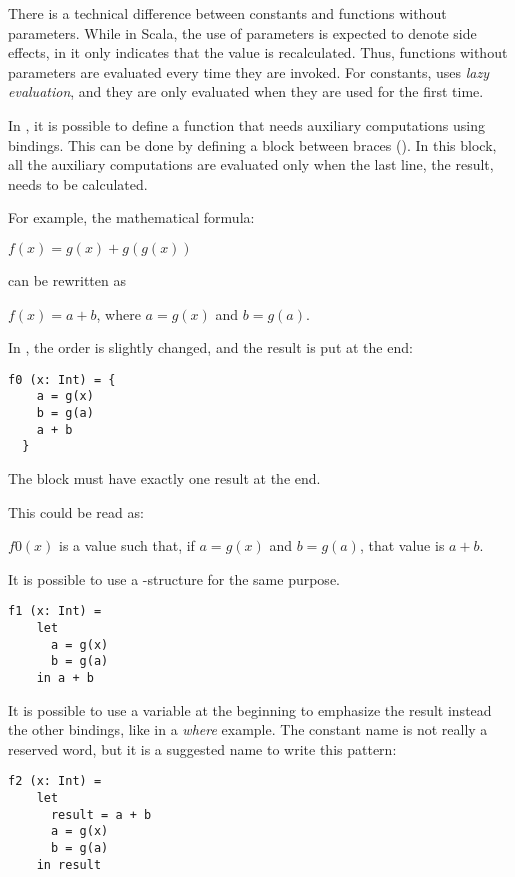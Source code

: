 There is a technical difference between constants and functions without parameters.
While in Scala, the use of parameters is expected to denote side effects, in \Soda it only indicates that the value is recalculated.
Thus, functions without parameters are evaluated every time they are invoked.
For constants, \Soda uses \textit{lazy evaluation}, and they are only evaluated when they are used for the first time.

In \Soda, it is possible to define a function that needs auxiliary computations using bindings.
This can be done by defining a block between braces (\srccode{\{ \}}).
In this block, all the auxiliary computations are evaluated only when the last line, the result, needs to be calculated.

For example, the mathematical formula:
\begin{center}
    $f(x) = g(x) + g(g(x))$
\end{center}
can be rewritten as
\begin{center}
    $f(x) = a + b$, where $a = g(x)$ and $b = g(a)$.
\end{center}

In \Soda, the order is slightly changed, and the result is put at the end:
\begin{lstlisting}[label={lst:exampleFunctionWithBraces}]
  f0 (x: Int) = {
    a = g(x)
    b = g(a)
    a + b
  }
\end{lstlisting}
The block must have exactly one result at the end.

This could be read as:
\begin{center}
    $f0(x)$ is a value such that, if $a = g(x)$ and $b = g(a)$, that value is $a + b$.
\end{center}

It is possible to use a \slet-\sdin structure for the same purpose.
\begin{lstlisting}[label={lst:exampleFunctionWithLetIn}]
  f1 (x: Int) =
    let
      a = g(x)
      b = g(a)
    in a + b
\end{lstlisting}

It is possible to use a variable at the beginning to emphasize the result instead the other bindings, like in a \textit{where} example.
The constant name  is not really a reserved word, but it is a suggested name to write this pattern:

\begin{lstlisting}[label={lst:exampleFunctionLikeWhere}]
  f2 (x: Int) =
    let
      result = a + b
      a = g(x)
      b = g(a)
    in result
\end{lstlisting}


